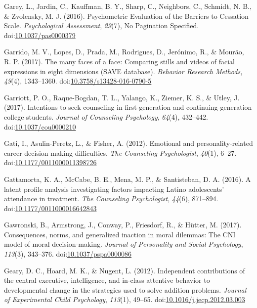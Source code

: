 \documentclass[english,man]{apa6}
\begin{document}
\hypertarget{ref-Garey2017}{}
Garey, L., Jardin, C., Kauffman, B. Y., Sharp, C., Neighbors, C.,
Schmidt, N. B., \& Zvolensky, M. J. (2016). Psychometric Evaluation of
the Barriers to Cessation Scale. \emph{Psychological Assessment},
\emph{29}(7), No Pagination Specified.
doi:\href{https://doi.org/10.1037/pas0000379}{10.1037/pas0000379}

\hypertarget{ref-Garrido2016}{}
Garrido, M. V., Lopes, D., Prada, M., Rodrigues, D., Jerónimo, R., \&
Mourão, R. P. (2017). The many faces of a face: Comparing stills and
videos of facial expressions in eight dimensions (SAVE database).
\emph{Behavior Research Methods}, \emph{49}(4), 1343--1360.
doi:\href{https://doi.org/10.3758/s13428-016-0790-5}{10.3758/s13428-016-0790-5}

\hypertarget{ref-Garriott2017}{}
Garriott, P. O., Raque-Bogdan, T. L., Yalango, K., Ziemer, K. S., \&
Utley, J. (2017). Intentions to seek counseling in first-generation and
continuing-generation college students. \emph{Journal of Counseling
Psychology}, \emph{64}(4), 432--442.
doi:\href{https://doi.org/10.1037/cou0000210}{10.1037/cou0000210}

\hypertarget{ref-Gati2012}{}
Gati, I., Asulin-Peretz, L., \& Fisher, A. (2012). Emotional and
personality-related career decision-making difficulties. \emph{The
Counseling Psychologist}, \emph{40}(1), 6--27.
doi:\href{https://doi.org/10.1177/0011000011398726}{10.1177/0011000011398726}

\hypertarget{ref-Gattamorta2016}{}
Gattamorta, K. A., McCabe, B. E., Mena, M. P., \& Santisteban, D. A.
(2016). A latent profile analysis investigating factors impacting Latino
adolescents' attendance in treatment. \emph{The Counseling
Psychologist}, \emph{44}(6), 871--894.
doi:\href{https://doi.org/10.1177/0011000016642843}{10.1177/0011000016642843}

\hypertarget{ref-Gawronski2017}{}
Gawronski, B., Armstrong, J., Conway, P., Friesdorf, R., \& Hütter, M.
(2017). Consequences, norms, and generalized inaction in moral dilemmas:
The CNI model of moral decision-making. \emph{Journal of Personality and
Social Psychology}, \emph{113}(3), 343--376.
doi:\href{https://doi.org/10.1037/pspa0000086}{10.1037/pspa0000086}

\hypertarget{ref-Geary2012}{}
Geary, D. C., Hoard, M. K., \& Nugent, L. (2012). Independent
contributions of the central executive, intelligence, and in-class
attentive behavior to developmental change in the strategies used to
solve addition problems. \emph{Journal of Experimental Child
Psychology}, \emph{113}(1), 49--65.
doi:\href{https://doi.org/10.1016/j.jecp.2012.03.003}{10.1016/j.jecp.2012.03.003}
\end{document}
